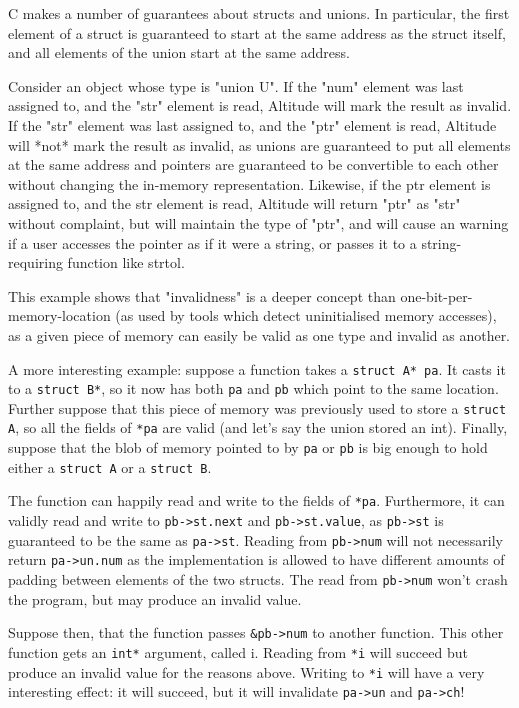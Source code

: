 \documentclass[10pt,a4paper]{report}
\begin{document}
C makes a number of guarantees about structs and unions. In particular, the first element of a struct is guaranteed to start at the same address as the struct itself, and all elements of the union start at the same address.

Consider an object whose type is "union U". If the "num" element was last assigned to, and the "str" element is read, Altitude will mark the result as invalid. If the "str" element was last assigned to, and the "ptr" element is read, Altitude will *not* mark the result as invalid, as unions are guaranteed to put all elements at the same address and pointers are guaranteed to be convertible to each other without changing the in-memory representation. Likewise, if the ptr element is assigned to, and the str element is read, Altitude will return "ptr" as "str" without complaint, but will maintain the type of "ptr", and will cause an warning if a user accesses the pointer as if it were a string, or passes it to a string-requiring function like strtol.

This example shows that "invalidness" is a deeper concept than one-bit-per-memory-location (as used by tools which detect uninitialised memory accesses), as a given piece of memory can easily be valid as one type and invalid as another.

A more interesting example: suppose a function takes a \lstinline{struct A* pa}. It casts it to a \lstinline{struct B*}, so it now has both \lstinline{pa} and \lstinline{pb} which point to the same location. Further suppose that this piece of memory was previously used to store a \lstinline{struct A}, so all the fields of \lstinline{*pa} are valid (and let's say the union stored an int). Finally, suppose that the blob of memory pointed to by \lstinline{pa} or \lstinline{pb} is big enough to hold either a \lstinline{struct A} or a \lstinline{struct B}.

The function can happily read and write to the fields of \lstinline{*pa}. Furthermore, it can validly read and write to \lstinline{pb->st.next} and \lstinline{pb->st.value}, as \lstinline{pb->st} is guaranteed to be the same as \lstinline{pa->st}. Reading from \lstinline{pb->num} will not necessarily return \lstinline{pa->un.num} as the implementation is allowed to have different amounts of padding between elements of the two structs. The read from \lstinline{pb->num} won't crash the program, but may produce an invalid value.

Suppose then, that the function passes \lstinline{&pb->num} to another function. This other function gets an \lstinline{int*} argument, called i. Reading from \lstinline{*i} will succeed but produce an invalid value for the reasons above. Writing to \lstinline{*i} will have a very interesting effect: it will succeed, but it will invalidate \lstinline{pa->un} and \lstinline{pa->ch}!
\end{document}
